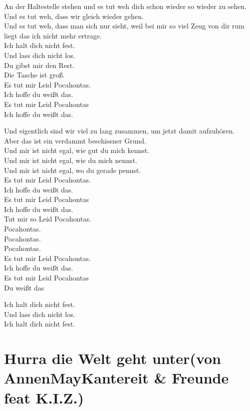 \documentclass[]{book}
\begin{document}
An der Haltestelle stehen und es tut weh dich schon wieder so wieder zu sehen.\\
Und es tut weh, dass wir gleich wieder gehen.\\
Und es tut weh, dass man sich nur sieht, weil bei mir so viel Zeug von dir rum liegt das ich nicht mehr ertrage.\\
Ich halt dich nicht fest.\\
Und lass dich nicht los.\\
Du gibst mir den Rest.\\
Die Tasche ist groß.\\
Es tut mir Leid Pocahontas.\\
Ich hoffe du weißt das.\\
Es tut mir Leid Pocahontas\\
Ich hoffe du weißt das.

Und eigentlich sind wir viel zu lang zusammen, um jetzt damit aufzuhören.\\
Aber das ist ein verdammt beschissner Grund.\\
Und mir ist nicht egal, wie gut du mich kennst.\\
Und mir ist nicht egal, wie du mich nennst.\\
Und mir ist nicht egal, wo du gerade pennst.\\
Es tut mir Leid Pocahontas.\\
Ich hoffe du weißt das.\\
Es tut mir Leid Pocahontas\\
Ich hoffe du weißt das.\\
Tut mir so Leid Pocahontas.\\
Pocahontas.\\
Pocahontas.\\
Pocahontas.\\
Es tut mir Leid Pocahontas.\\
Ich hoffe du weißt das.\\
Es tut mir Leid Pocahontas\\
Du weißt das

Ich halt dich nicht fest.\\
Und lass dich nicht los.\\
Ich halt dich nicht fest.

\hypertarget{hurra-die-welt-geht-untervon-annenmaykantereit-freunde-feat-k.i.z.}{%
\section{Hurra die Welt geht unter(von AnnenMayKantereit \& Freunde feat K.I.Z.)}\label{hurra-die-welt-geht-untervon-annenmaykantereit-freunde-feat-k.i.z.}}
\end{document}
